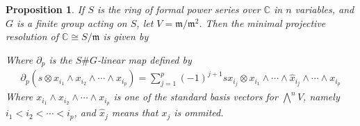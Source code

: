 \documentclass[11pt, a4paper, english]{article}
\newtheorem{prop}{Proposition}
\numberwithin{prop}{section}
\numberwithin{lemma}{section}
\numberwithin{theorem}{section}
\numberwithin{defin}{section}
\numberwithin{example}{section}
\newcommand{\C}{\mathbb{C}}
\begin{document}
\begin{prop}
If $S$ is the ring of formal power series over $\C$ in $n$ variables, and $G$ is a finite group acting on $S$, let $V=\mathfrak{m}/\mathfrak{m}^2$. Then the minimal projective resolution of $\C \cong S/\mathfrak{m}$ is given by
\begin{center}
\end{center}
Where $\partial_p$ is the $S\#G$-linear map defined by
\begin{align*}
\partial_p(s \otimes x_{i_1} \wedge x_{i_2} \wedge \cdots \wedge x_{i_p}) = \sum_{j=1}^{p} (-1)^{j+1} sx_{i_j} \otimes x_{i_1} \wedge \cdots \wedge \hat{x}_{i_{j}} \wedge \cdots \wedge x_{i_{p}} 
\end{align*}
Where $x_{i_1} \wedge x_{i_2} \wedge \cdots \wedge x_{i_p}$ is one of the standard basis vectors for $\bigwedge\limits^n V$, namely $i_1 < i_2 < \cdots < i_p$, and  $\hat{x}_j$ means that $x_j$ is ommited.


\end{prop}
\end{document}
